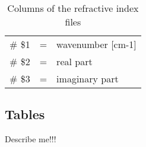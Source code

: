 \begin{table*}[!h]
\caption{Columns of the refractive index files}
\begin{tabular}{lcl}
\# \$1 & = & wavenumber [cm-1] \\
\# \$2 & = & real part \\
\# \$3 & = & imaginary part \\
\end{tabular}
\label{tab:Refrac}
\end{table*} 


\subsection{Tables}
\label{sec:Tables}
\todo Describe me!!!

